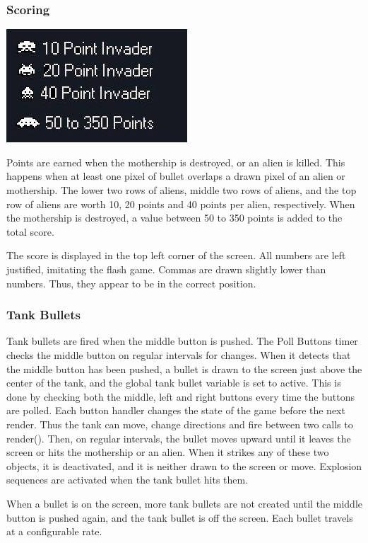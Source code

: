 \documentclass[11pt,letter,oneside]{report}
\begin{document}
\subsubsection{Scoring}
\includegraphics[]{scoring.jpg}

Points are earned when the mothership is destroyed, or an alien is killed. This happens when at least one pixel of bullet overlaps a drawn pixel of an alien or mothership. The lower two rows of aliens, middle two rows of aliens, and the top row of aliens are worth 10, 20 points and 40 points per alien, respectively. When the mothership is destroyed, a value between 50 to 350 points is added to the total score.

The score is displayed in the top left corner of the screen. All numbers are left justified, imitating the flash game. Commas are drawn slightly lower than numbers. Thus, they appear to be in the correct position.


\subsubsection{Tank Bullets}
Tank bullets are fired when the middle button is pushed. The Poll Buttons timer checks the middle button on regular intervals for changes. When it detects that the middle button has been pushed, a bullet is drawn to the screen just above the center of the tank, and the global tank bullet variable is set to active. This is done by checking both the middle, left and right buttons every time the buttons are polled. Each button handler changes the state of the game before the next render. Thus the tank can move, change directions and fire between two calls to render(). Then, on regular intervals, the bullet moves upward until it leaves the screen or hits the mothership or an alien. When it strikes any of these two objects, it is deactivated, and it is neither drawn to the screen or move. Explosion sequences are activated when the tank bullet hits them.

When a bullet is on the screen, more tank bullets are not created until the middle button is pushed again, and the tank bullet is off the screen.  Each bullet travels at a configurable rate.
\end{document}
